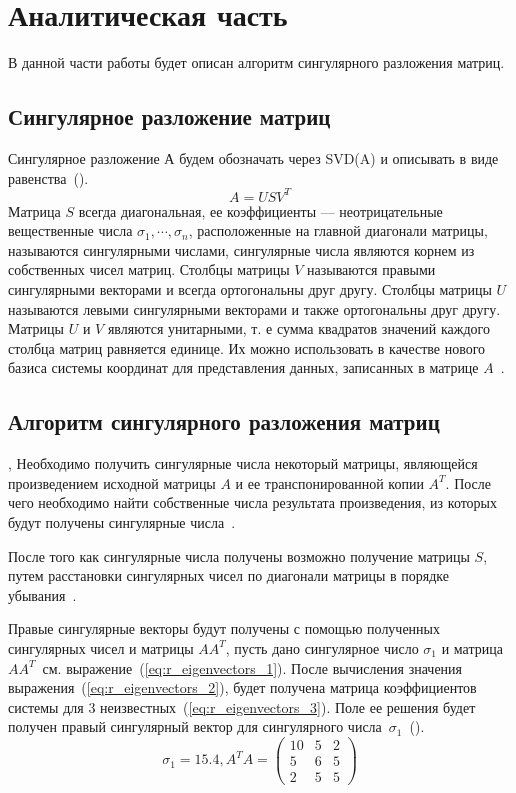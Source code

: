 \chapter{Аналитическая часть}
В данной части работы будет описан алгоритм сингулярного разложения матриц.






\section{Сингулярное разложение матриц}
Сингулярное разложение А будем обозначать через 
SVD(A) и описывать в виде равенства~(\cite{SVD_def}).
\begin{equation}
	A = USV^{T}
	\label{eq:SVD_def}
\end{equation}
Матрица $S$ всегда диагональная, ее коэффициенты –-- неотрицательные вещественные числа $\sigma_{1}, \cdots, \sigma_{n}$, расположенные на главной диагонали матрицы, называются сингулярными числами, сингулярные числа являются корнем из собственных чисел матриц. Столбцы матрицы $V$ называются правыми сингулярными векторами и всегда ортогональны 
друг другу. Столбцы матрицы $U$ называются левыми сингулярными векторами и также ортогональны друг другу. Матрицы $U$ и $V$ являются унитарными, т. е сумма квадратов значений каждого столбца матриц равняется единице. Их можно использовать в качестве нового базиса системы координат для представления данных, записанных в матрице $A$~\cite{SVD}.

\section{Алгоритм сингулярного разложения матриц}
, Необходимо получить сингулярные числа некоторый матрицы, являющейся  произведением исходной матрицы $A$ и ее транспонированной копии $A^{T}$. После чего необходимо найти собственные числа результата произведения, из которых будут получены сингулярные числа~\cite{SVD,pers_val}.

После того как сингулярные числа получены возможно получение матрицы $S$, путем расстановки сингулярных чисел по диагонали матрицы в порядке убывания~\cite{SVD_algo}.

Правые сингулярные векторы будут получены с помощью полученных сингулярных чисел и матрицы $AA^{T}$, пусть дано сингулярное число $\sigma_{1}$ и матрица $AA^{T}$~см. выражение~(\ref{eq:r_eigenvectors_1}). После вычисления значения выражения~(\ref{eq:r_eigenvectors_2}), будет получена матрица коэффициентов системы для 3 неизвестных~(\ref{eq:r_eigenvectors_3}). Поле ее решения будет получен правый сингулярный вектор для сингулярного числа~$\sigma_{1}$~(\cite{SVD_algo}).
\begin{equation}
	\sigma_{1}=15.4, A^{T}A=\begin{pmatrix}
	10 & 5 & 2\\ 
	5 & 6  &5\\
		2 & 5 & 5
	\end{pmatrix}
	\label{eq:r_eigenvectors_1}
\end{equation}

